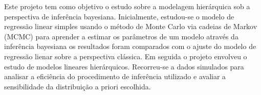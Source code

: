 \documentclass[12pt,a4paper,header]{abnt}
\begin{document}









\begin{resumo}


Este projeto tem como objetivo o estudo sobre a modelagem hierárquica sob a perspectiva de inferência bayesiana. Inicialmente, estudou-se o modelo de regressão linear simples usando o método de Monte Carlo via cadeias de Markov (MCMC) para aprender a estimar os parâmetros de um modelo através da inferência bayesiana os resultados foram comparados com o ajuste do modelo de regressão lienar sobre a perspectiva clássica. Em seguida o projeto envolveu o estudo de modelos lineares hierárquicos. Recorreu-se a dados simulados para analisar a eficiência do procedimento de inferência utilizado e avaliar a sensibilidade da distribuição a priori escolhida.


\end{resumo}






\end{document}
